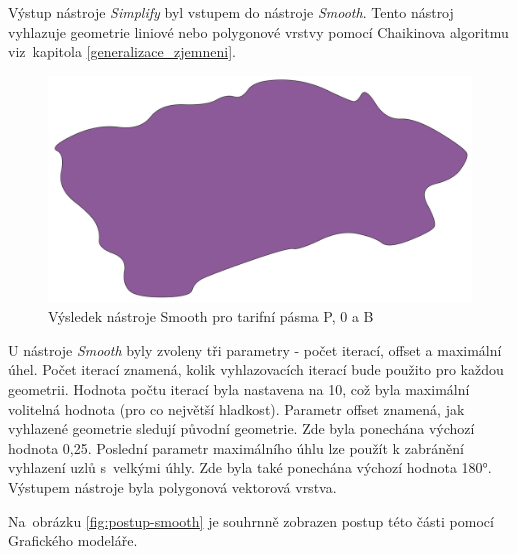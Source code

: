 Výstup nástroje \textit{Simplify} byl vstupem do nástroje \textit{Smooth}. Tento nástroj vy\-hlazuje geometrie
liniové nebo polygonové vrstvy pomocí Chaikinova algoritmu viz~ka\-pitola \ref{generalizace_zjemneni}.

\begin{figure}[H] \centering
    \includegraphics[width=400pt]{./pictures/smooth-P0B.png}
    \caption[Výsledek nástroje Smooth pro tarifní pásma P, 0 a B]{Výsledek nástroje Smooth pro tarifní pásma P, 0 a B}
	\label{fig:smooth-P0B}                                
\end{figure}

U nástroje \textit{Smooth} byly zvoleny tři parametry - počet iterací, offset a maximální úhel.
Počet iterací znamená, kolik vyhlazovacích iterací bude použito pro každou geometrii.
Hodnota počtu iterací byla nastavena na 10, což byla maximální volitelná hodnota (pro co největší hladkost).
Parametr offset znamená, jak  vyhlazené geometrie sledují původní geometrie.
Zde byla ponechána výchozí hodnota 0,25. Poslední parametr maximálního úhlu lze použít
k zabránění vyhlazení uzlů s~velkými úhly. Zde byla také ponechána výchozí hodnota 180°.
Výstupem nástroje byla polygonová vektorová vrstva.

Na~obrá\-zku \ref{fig:postup-smooth} je souhrnně zobrazen postup této části pomocí Grafického modeláře.

